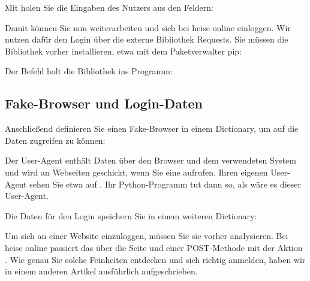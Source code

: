 Mit  holen Sie die Eingaben des Nutzers aus den Feldern:

\medskip



\medskip

Damit können Sie nun weiterarbeiten und sich bei heise online einloggen. Wir nutzen dafür den Login über die externe Bibliothek Requests. Sie müssen die Bibliothek vorher installieren, etwa mit dem Paketverwalter pip:

\medskip


\medskip


Der Befehl  holt die Bibliothek ins Programm:

\medskip





\subsection{Fake-Browser und Login-Daten}

Anschließend definieren Sie einen Fake-Browser in einem Dictionary, um auf die Daten zugreifen zu können:

\medskip


\medskip

Der User-Agent enthält Daten über den Browser und dem verwendeten System und wird an Webseiten geschickt, wenn Sie eine aufrufen. Ihren eigenen User-Agent sehen Sie etwa auf . Ihr Python-Programm tut dann so, als wäre es dieser User-Agent.

Die Daten für den Login speichern Sie in einem weiteren Dictionary:

\medskip


\medskip

Um sich an einer Website einzuloggen, müssen Sie sie vorher analysieren. Bei heise online passiert das über die Seite  und einer POST-Methode mit der Aktion . Wie genau Sie solche Feinheiten entdecken und sich richtig anmelden, haben wir in einem anderen Artikel ausführlich aufgeschrieben.

